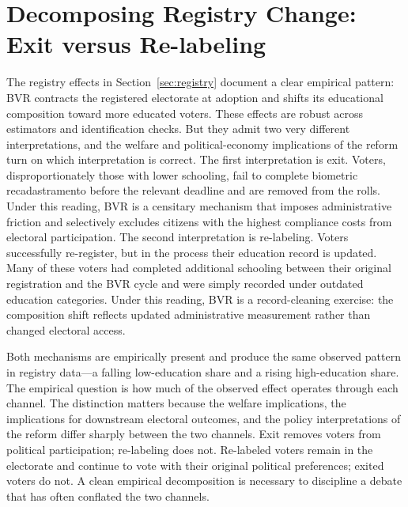 \section{Decomposing Registry Change: Exit versus Re-labeling}
\label{sec:decomposition}

The registry effects in Section~\ref{sec:registry} document a clear empirical pattern: BVR contracts the registered electorate at adoption and shifts its educational composition toward more educated voters. These effects are robust across estimators and identification checks. But they admit two very different interpretations, and the welfare and political-economy implications of the reform turn on which interpretation is correct. The first interpretation is exit. Voters, disproportionately those with lower schooling, fail to complete biometric recadastramento before the relevant deadline and are removed from the rolls. Under this reading, BVR is a censitary mechanism that imposes administrative friction and selectively excludes citizens with the highest compliance costs from electoral participation. The second interpretation is re-labeling. Voters successfully re-register, but in the process their education record is updated. Many of these voters had completed additional schooling between their original registration and the BVR cycle and were simply recorded under outdated education categories. Under this reading, BVR is a record-cleaning exercise: the composition shift reflects updated administrative measurement rather than changed electoral access.

Both mechanisms are empirically present and produce the same observed pattern in registry data---a falling low-education share and a rising high-education share. The empirical question is how much of the observed effect operates through each channel. The distinction matters because the welfare implications, the implications for downstream electoral outcomes, and the policy interpretations of the reform differ sharply between the two channels. Exit removes voters from political participation; re-labeling does not. Re-labeled voters remain in the electorate and continue to vote with their original political preferences; exited voters do not. A clean empirical decomposition is necessary to discipline a debate that has often conflated the two channels.

